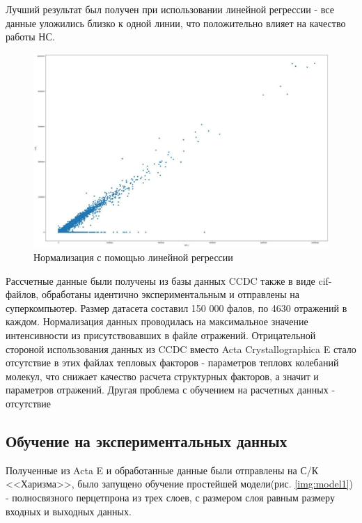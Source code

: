 \documentclass{article}
\begin{document}
Лучший результат был получен при использовании линейной регрессии - все данные уложились близко к одной линии, что положительно влияет на качество работы НС.

\begin{figure}[h!]
\includegraphics[width=\linewidth]{imgs/dist_lr.jpg}
  \caption{Нормализация с помощью линейной регрессии}\label{img:dist_lr}
\end{figure}


Рассчетные данные были получены из базы данных CCDC также в виде cif-файлов, обработаны идентично экспериментальным и отправлены на суперкомпьютер. Размер датасета составил 150 000 фалов, по 4630 отражений в каждом. Нормализация данных проводилась на максимальное значение интенсивности из присутствовавших в файле отражений. Отрицательной стороной использования данных из CCDC вместо Acta Crystallographica E стало отсутствие в этих файлах тепловых факторов - параметров тепловх колебаний молекул, что снижает качество расчета структурных факторов, а значит и параметров отражений. Другая проблема с обучением на расчетных данных - отсутствие  

\subsection{Обучение на экспериментальных данных}
Полученные из Acta E и обработанные данные были отправлены на С/К <<Харизма>>, было запущено обучение простейшей модели(рис. \ref{img:model1}) - полносвязного перцетпрона из трех слоев, с размером слоя равным размеру входных и выходных данных.  
\end{document}
